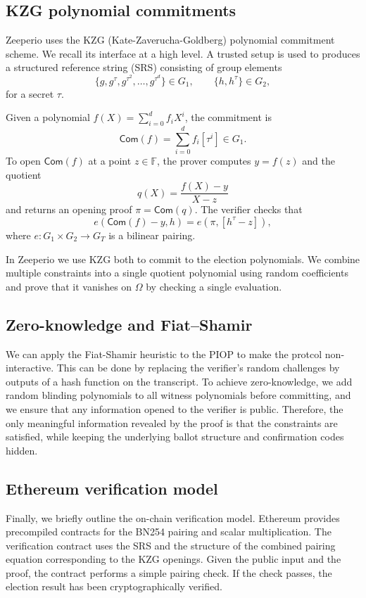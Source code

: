 \subsection{KZG polynomial commitments}

Zeeperio uses the KZG (Kate-Zaverucha-Goldberg) polynomial commitment scheme.
We recall its interface at a high level.
A trusted setup is used to produces a structured reference string (SRS) consisting of group elements
\[
  \{g, g^\tau, g^{\tau^2}, \ldots, g^{\tau^d}\} \in G_1, \qquad \{h, h^\tau\} \in G_2,
\]
for a secret $\tau$.

Given a polynomial $f(X) = \sum_{i=0}^d f_i X^i$, the commitment is
\[
  \mathsf{Com}(f) = \sum_{i=0}^d f_i [\tau^i] \in G_1.
\]
To open $\mathsf{Com}(f)$ at a point $z \in \mathbb{F}$, the prover computes $y = f(z)$ and the quotient
\[
  q(X) = \frac{f(X) - y}{X - z}
\]
and returns an opening proof $\pi = \mathsf{Com}(q)$.
The verifier checks that
\[
  e(\mathsf{Com}(f) - y, h) = e(\pi, [h^\tau - z]),
\]
where $e : G_1 \times G_2 \to G_T$ is a bilinear pairing.

In Zeeperio we use KZG both to commit to the election polynomials.
We combine multiple constraints into a single quotient polynomial using random coefficients and prove that it vanishes on $\Omega$ by checking a single evaluation.

\subsection{Zero-knowledge and Fiat--Shamir}

We can apply the Fiat-Shamir heuristic to the PIOP to make the protcol non-interactive.
This can be done by replacing the verifier's random challenges by outputs of a hash function on the transcript.
To achieve zero-knowledge, we add random blinding polynomials to all witness polynomials before committing, and we ensure that any information opened to the verifier is public.
Therefore, the only meaningful information revealed by the proof is that the constraints are satisfied, while keeping the underlying ballot structure and confirmation codes hidden.

\subsection{Ethereum verification model}

Finally, we briefly outline the on-chain verification model.
Ethereum provides precompiled contracts for the BN254 pairing and scalar multiplication.
The verification contract uses the SRS and the structure of the combined pairing equation corresponding to the KZG openings.
Given the public input and the proof, the contract performs a simple pairing check.
If the check passes, the election result has been cryptographically verified.

